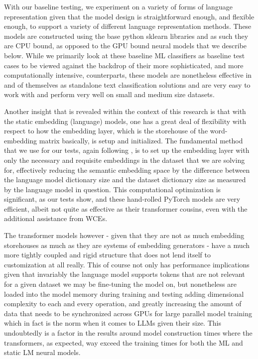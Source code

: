 \documentclass[final]{clv2025-revised}
\begin{document}
With our baseline testing, we experiment on a variety of forms of language representation given that the model design is straightforward enough, and flexible enough, to support a variety of different language representation methods. These models are constructed using the base python sklearn libraries and as such they are CPU bound, as opposed to the GPU bound neural models that we describe below. While we primarily look at these baseline ML classifiers as baseline test cases to be viewed against the backdrop of their more sophisticated, and more computationally intensive, counterparts, these models are nonetheless effective in and of themselves as standalone text classification solutions and are very easy to work with and perform very well on small and medium size datasets. 

Another insight that is revealed within the context of this research is that with the static embedding (language) models, one has a great deal of flexibility with respect to how the embedding layer, which is the storehouse of the word-embedding matrix basically, is setup and initialized. The fundamental method that we use for our tests, again following \cite{moreo2021}, is to set up the embedding layer with only the necessary and requisite embeddings in the dataset that we are solving for, effectively reducing the semantic embedding space by the difference between the language model dictionary size and the dataset dictionary size as measured by the language model in question. This computational optimization is significant, as our tests show, and these hand-rolled PyTorch models are very efficient, albeit not quite as effective as their transformer cousins, even with the additional assistance from WCEs.

The transformer models however - given that they are not as much embedding storehouses as much as they are systems of embedding generators - have a much more tightly coupled and rigid structure that does not lend itself to customization at all really. This of course not only has performance implications given that invariably the language model supports tokens that are not relevant for a given dataset we may be fine-tuning the model on, but nonetheless are loaded into the model memory during training and testing adding dimensional complexity to each and every operation, and greatly increasing the amount of data that needs to be synchronized across GPUs for large parallel model training which in fact is the norm when it comes to LLMs given their size. This undoubtedly is a factor in the results around model construction times where the transformers, as expected, way exceed the training times for both the ML and static LM neural models.
\end{document}
